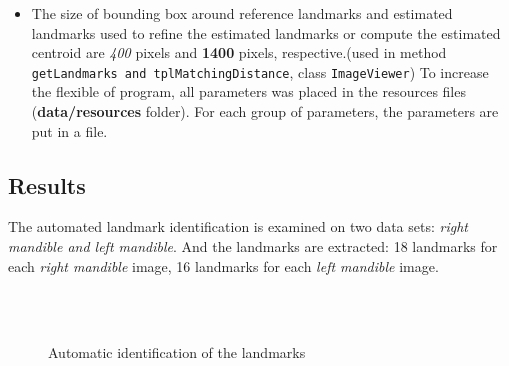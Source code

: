 \begin{itemize}
\item The size of bounding box around reference landmarks and estimated landmarks used to refine the estimated landmarks or compute the estimated centroid are \textit{400} pixels and \textbf{1400} pixels, respective.(used in method \texttt{getLandmarks and tplMatchingDistance}, class \texttt{ImageViewer})
To increase the flexible of program, all parameters was placed in the resources files (\textbf{data/resources} folder). For each group of parameters, the parameters are put in a file.
\end{itemize}
\subsection{Results}
The automated landmark identification is examined on two data sets: \textit{right mandible and left mandible}. And the landmarks are extracted: 18 landmarks for each \textit{right mandible} image, 16 landmarks for each \textit{left mandible} image.
\begin{figure}[h!]
\centering
{}\\
~~
\caption{Automatic identification of the landmarks}
\label{fig:46}
\end{figure}~\\

